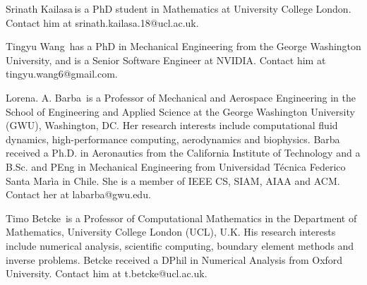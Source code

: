 \documentclass{IEEEcsmag}
\begin{document}


\begin{IEEEbiography}{Srinath Kailasa}{\,}is a PhD student in Mathematics at University College London. Contact him at srinath.kailasa.18@ucl.ac.uk.
\end{IEEEbiography}

\begin{IEEEbiography}{Tingyu Wang}{\,} has a PhD in Mechanical Engineering from the George Washington University, and is a Senior Software Engineer at NVIDIA. Contact him at tingyu.wang6@gmail.com.
\end{IEEEbiography}

\begin{IEEEbiography}{Lorena. A. Barba}{\,} is a Professor of Mechanical and Aerospace Engineering in the School of Engineering and Applied Science at the George Washington University (GWU), Washington, DC. Her research interests include computational fluid dynamics, high-performance computing, aerodynamics and biophysics. Barba received a Ph.D. in Aeronautics from the California Institute of Technology and a B.Sc. and PEng in Mechanical Engineering from Universidad T\'ecnica Federico Santa Mar\`ia in Chile. She is a member of IEEE CS, SIAM, AIAA and ACM. Contact her at labarba@gwu.edu.
\end{IEEEbiography}

\begin{IEEEbiography}{Timo Betcke}{\,} is a Professor of Computational Mathematics in the Department of Mathematics, University College London (UCL), U.K. His research interests include numerical analysis, scientific computing, boundary element methods and inverse problems. Betcke received a DPhil in Numerical Analysis from Oxford University. Contact him at t.betcke@ucl.ac.uk.\end{IEEEbiography}
\end{document}
